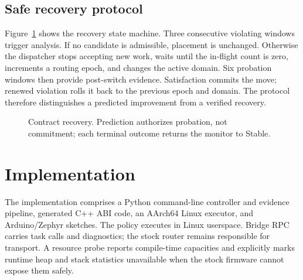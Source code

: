 \documentclass[conference]{IEEEtran}
\begin{document}
\subsection{Safe recovery protocol}
Figure~\ref{fig:state} shows the recovery state machine. Three consecutive
violating windows trigger analysis. If no candidate is admissible, placement is
unchanged. Otherwise the dispatcher stops accepting new work, waits until the
in-flight count is zero, increments a routing epoch, and changes the active
domain. Six probation windows then provide post-switch evidence. Satisfaction
commits the move; renewed violation rolls it back to the previous epoch and
domain. The protocol therefore distinguishes a predicted improvement from a
verified recovery.

\begin{figure}[t]
\centering
{}
\caption{Contract recovery. Prediction authorizes probation, not commitment;
each terminal outcome returns the monitor to Stable.}
\label{fig:state}
\end{figure}

\section{Implementation}
The implementation comprises a Python command-line controller and evidence
pipeline, generated C++ ABI code, an AArch64 Linux executor, and Arduino/Zephyr
sketches. The policy executes in Linux userspace. Bridge RPC carries task calls
and diagnostics; the stock router remains responsible for transport. A
resource probe reports compile-time capacities and explicitly marks runtime
heap and stack statistics unavailable when the stock firmware cannot expose
them safely.
\end{document}
